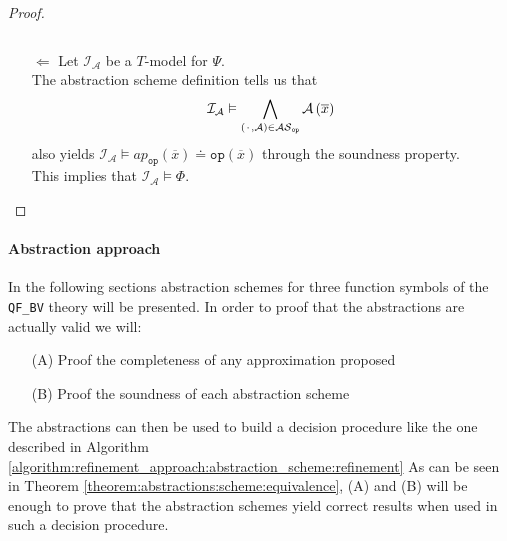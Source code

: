 \begin{theorem}
\begin{proof}
\begin{itemize}
\[        \]
    \item[$\Leftarrow$]  Let $\mathcal{I}_{\mathcal{A}}$ be a $T$-model for $\Psi$.\\
        The abstraction scheme definition tells us that
        \[
            \mathcal{I}_{\mathcal{A}} \vDash \bigwedge\limits_{\left({\mkern 2mu\cdot\mkern 2mu},\mathcal{A}\right)\in\mathcal{AS}_{\texttt{op}}} \mathcal{A}\left(\overline{x}\right)
        \] 
        also yields $\mathcal{I}_{\mathcal{A}} \vDash ap_{\texttt{op}}\left(\overline{x}\right) \doteq \texttt{op}\left(\overline{x}\right)$ through the soundness property.\\
        This implies that $\mathcal{I}_{\mathcal{A}} \vDash \Phi$.
\end{itemize}
\end{proof}
\end{theorem}

\paragraph{Abstraction approach}
In the following sections abstraction schemes for three function symbols of the \texttt{QF\_BV} theory will be presented.
In order to proof that the abstractions are actually valid we will:
\begin{itemize}
    \item[(A)] Proof the completeness of any approximation proposed
    \item[(B)] Proof the soundness of each abstraction scheme
\end{itemize}
The abstractions can then be used to build a decision procedure like the one described in Algorithm \ref{algorithm:refinement_approach:abstraction_scheme:refinement}
As can be seen in Theorem \ref{theorem:abstractions:scheme:equivalence}, (A) and (B) will be enough to prove that the abstraction schemes yield correct results when used in such a decision procedure.\\


